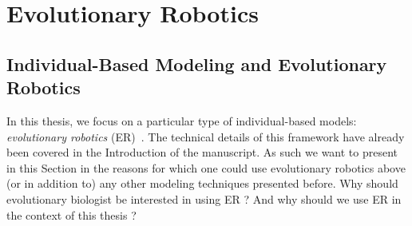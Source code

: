 

\section{Evolutionary Robotics}     

    \subsection{Individual-Based Modeling and Evolutionary Robotics}

        In this thesis, we focus on a particular type of individual-based models: \emph{evolutionary robotics} (ER)~\parencite{Nolfi2000, Doncieux2015a}. The technical details of this framework have already been covered in the Introduction of the manuscript. As such we want to present in this Section in the reasons for which one could use evolutionary robotics above (or in addition to) any other modeling techniques presented before. Why should evolutionary biologist be interested in using ER ? And why should we use ER in the context of this thesis ?



